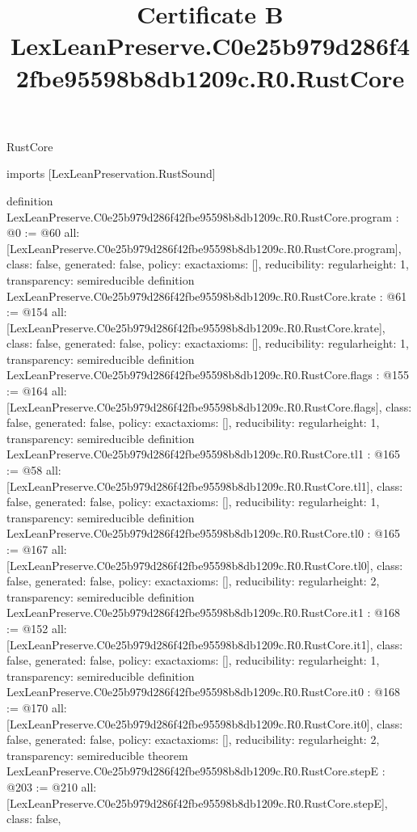 \begin{lexlean}{RustCore}
\title{Certificate B LexLeanPreserve.C0e25b979d286f42fbe95598b8db1209c.R0.RustCore}
\begin{coremodule}
imports [LexLeanPreservation.RustSound]

definition LexLeanPreserve.C0e25b979d286f42fbe95598b8db1209c.R0.RustCore.program : @0 := @60 {
  all: [LexLeanPreserve.C0e25b979d286f42fbe95598b8db1209c.R0.RustCore.program],
  class: false,
  generated: false,
  policy: exact{axioms: []},
  reducibility: regular{height: 1},
  transparency: semireducible
}
definition LexLeanPreserve.C0e25b979d286f42fbe95598b8db1209c.R0.RustCore.krate : @61 := @154 {
  all: [LexLeanPreserve.C0e25b979d286f42fbe95598b8db1209c.R0.RustCore.krate],
  class: false,
  generated: false,
  policy: exact{axioms: []},
  reducibility: regular{height: 1},
  transparency: semireducible
}
definition LexLeanPreserve.C0e25b979d286f42fbe95598b8db1209c.R0.RustCore.flags : @155 := @164 {
  all: [LexLeanPreserve.C0e25b979d286f42fbe95598b8db1209c.R0.RustCore.flags],
  class: false,
  generated: false,
  policy: exact{axioms: []},
  reducibility: regular{height: 1},
  transparency: semireducible
}
definition LexLeanPreserve.C0e25b979d286f42fbe95598b8db1209c.R0.RustCore.tl1 : @165 := @58 {
  all: [LexLeanPreserve.C0e25b979d286f42fbe95598b8db1209c.R0.RustCore.tl1],
  class: false,
  generated: false,
  policy: exact{axioms: []},
  reducibility: regular{height: 1},
  transparency: semireducible
}
definition LexLeanPreserve.C0e25b979d286f42fbe95598b8db1209c.R0.RustCore.tl0 : @165 := @167 {
  all: [LexLeanPreserve.C0e25b979d286f42fbe95598b8db1209c.R0.RustCore.tl0],
  class: false,
  generated: false,
  policy: exact{axioms: []},
  reducibility: regular{height: 2},
  transparency: semireducible
}
definition LexLeanPreserve.C0e25b979d286f42fbe95598b8db1209c.R0.RustCore.it1 : @168 := @152 {
  all: [LexLeanPreserve.C0e25b979d286f42fbe95598b8db1209c.R0.RustCore.it1],
  class: false,
  generated: false,
  policy: exact{axioms: []},
  reducibility: regular{height: 1},
  transparency: semireducible
}
definition LexLeanPreserve.C0e25b979d286f42fbe95598b8db1209c.R0.RustCore.it0 : @168 := @170 {
  all: [LexLeanPreserve.C0e25b979d286f42fbe95598b8db1209c.R0.RustCore.it0],
  class: false,
  generated: false,
  policy: exact{axioms: []},
  reducibility: regular{height: 2},
  transparency: semireducible
}
theorem LexLeanPreserve.C0e25b979d286f42fbe95598b8db1209c.R0.RustCore.stepE : @203 := @210 {
  all: [LexLeanPreserve.C0e25b979d286f42fbe95598b8db1209c.R0.RustCore.stepE],
  class: false,
}
\end{coremodule}
\end{lexlean}
